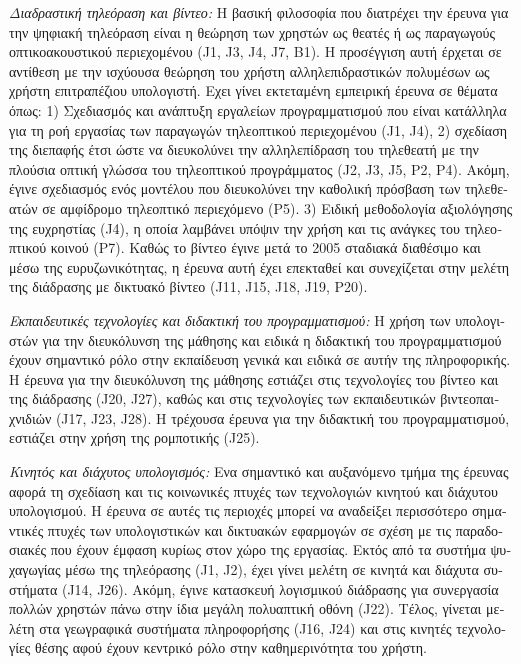 \documentclass[11pt, a4paper]{article}
\begin{document}
\begin{greek}
\emph{Διαδραστική τηλεόραση και βίντεο:} Η βασική φιλοσοφία που
διατρέχει την έρευνα για την ψηφιακή τηλεόραση είναι η θεώρηση των
χρηστών ως θεατές ή ως παραγωγούς οπτικοακουστικού περιεχομένου (J1, J3,
J4, J7, B1). Η προσέγγιση αυτή έρχεται σε αντίθεση με την ισχύουσα
θεώρηση του χρήστη αλληλεπιδραστικών πολυμέσων ως χρήστη επιτραπέζιου
υπολογιστή. Εχει γίνει εκτεταμένη εμπειρική έρευνα σε θέματα όπως: 1)
Σχεδιασμός και ανάπτυξη εργαλείων προγραμματισμού που είναι κατάλληλα
για τη ροή εργασίας των παραγωγών τηλεοπτικού περιεχομένου (J1, J4), 2)
σχεδίαση της διεπαφής έτσι ώστε να διευκολύνει την αλληλεπίδραση του
τηλεθεατή με την πλούσια οπτική γλώσσα του τηλεοπτικού προγράμματος (J2,
J3, J5, P2, P4). Ακόμη, έγινε σχεδιασμός ενός μοντέλου που διευκολύνει
την καθολική πρόσβαση των τηλεθεατών σε αμφίδρομο τηλεοπτικό περιεχόμενο
(P5). 3) Ειδική μεθοδολογία αξιολόγησης της ευχρηστίας (J4), η οποία
λαμβάνει υπόψιν την χρήση και τις ανάγκες του τηλεοπτικού κοινού (P7).
Καθώς το βίντεο έγινε μετά το 2005 σταδιακά διαθέσιμο και μέσω της
ευρυζωνικότητας, η έρευνα αυτή έχει επεκταθεί και συνεχίζεται στην
μελέτη της διάδρασης με δικτυακό βίντεο (J11, J15, J18, J19, P20).

\emph{Εκπαιδευτικές τεχνολογίες και διδακτική του προγραμματισμού:} Η
χρήση των υπολογιστών για την διευκόλυνση της μάθησης και ειδικά η
διδακτική του προγραμματισμού έχουν σημαντικό ρόλο στην εκπαίδευση
γενικά και ειδικά σε αυτήν της πληροφορικής. Η έρευνα για την
διευκόλυνση της μάθησης εστιάζει στις τεχνολογίες του βίντεο και της
διάδρασης (J20, J27), καθώς και στις τεχνολογίες των εκπαιδευτικών
βιντεοπαιχνιδιών (J17, J23, J28). Η τρέχουσα έρευνα για την διδακτική
του προγραμματισμού, εστιάζει στην χρήση της ρομποτικής (J25).

\emph{Κινητός και διάχυτος υπολογισμός:} Ενα σημαντικό και αυξανόμενο
τμήμα της έρευνας αφορά τη σχεδίαση και τις κοινωνικές πτυχές των
τεχνολογιών κινητού και διάχυτου υπολογισμού. Η έρευνα σε αυτές τις
περιοχές μπορεί να αναδείξει περισσότερο σημαντικές πτυχές των
υπολογιστικών και δικτυακών εφαρμογών σε σχέση με τις παραδοσιακές που
έχουν έμφαση κυρίως στον χώρο της εργασίας. Εκτός από τα συστήμα
ψυχαγωγίας μέσω της τηλεόρασης (J1, J2), έχει γίνει μελέτη σε κινητά και
διάχυτα συστήματα (J14, J26). Ακόμη, έγινε κατασκευή λογισμικού
διάδρασης για συνεργασία πολλών χρηστών πάνω στην ίδια μεγάλη πολυαπτική
οθόνη (J22). Τέλος, γίνεται μελέτη στα γεωγραφικά συστήματα πληροφορήσης
(J16, J24) και στις κινητές τεχνολογίες θέσης αφού έχουν κεντρικό ρόλο
στην καθημερινότητα του χρήστη.


\end{greek}
\end{document}
